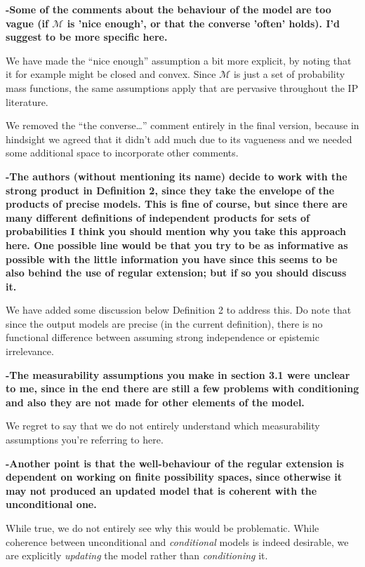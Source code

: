 \documentclass[twoside,11pt]{letter}
\begin{document}
{\bf 
-Some of the comments about the behaviour of the model are too vague (if $\mathcal{M}$ is 'nice enough', or that the converse 'often' holds). I'd suggest to be more specific here. }

We have made the ``nice enough'' assumption a bit more explicit, by noting that it for example might be closed and convex. Since $\mathcal{M}$ is just a set of probability mass functions, the same assumptions apply that are pervasive throughout the IP literature. 

We removed the ``the converse\ldots '' comment entirely in the final version, because in hindsight we agreed that it didn't add much due to its vagueness and we needed some additional space to incorporate other comments.

{\bf
-The authors (without mentioning its name) decide to work with the strong product in Definition 2, since they take the envelope of the products of precise models. This is fine of course, but since there are many different definitions of independent products for sets of probabilities I think you should mention why you take this approach here. One possible line would be that you try to be as informative as possible with the little information you have since this seems to be also behind the use of regular extension; but if so you should discuss it.
} 

We have added some discussion below Definition 2 to address this. Do note that since the output models are precise (in the current definition), there is no functional difference between assuming strong independence or epistemic irrelevance.

{\bf
-The measurability assumptions you make in section 3.1 were unclear to me, since in the end there are still a few problems with conditioning and also they are not made for other elements of the model. 
}

We regret to say that we do not entirely understand which measurability assumptions you're referring to here.

{\bf
-Another point is that the well-behaviour of the regular extension is dependent on working on finite possibility spaces, since otherwise it may not produced an updated model that is coherent with the unconditional one. 
}

While true, we do not entirely see why this would be problematic. While coherence between unconditional and \emph{conditional} models is indeed desirable, we are explicitly \emph{updating} the model rather than \emph{conditioning} it.
\end{document}
